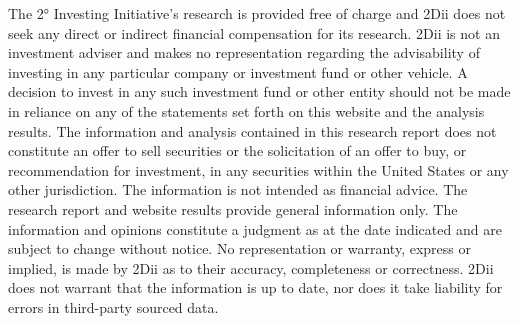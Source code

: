 \documentclass[10pt,table,a4]{article}\usepackage[]{graphicx}\usepackage[]{color}
\begin{document}
\begin{multicols}{2}
		The 2° Investing Initiative's research is provided free of charge and 2Dii does not seek any direct or indirect financial compensation for its research. 2Dii is not an investment adviser and makes no representation regarding the advisability of investing in any particular company or investment fund or other vehicle. A decision to invest in any such investment fund or other entity should not be made in reliance on any of the statements set forth on this website and the analysis results. The information and analysis contained in this research report does not constitute an offer to sell securities or the solicitation of an offer to buy, or recommendation for investment, in any securities within the United States or any other jurisdiction. The information is not intended as financial advice. The research report and website results provide general information only. The information and opinions constitute a judgment as at the date indicated and are subject to change without notice. No representation or warranty, express or implied, is made by 2Dii as to their accuracy, completeness or correctness. 2Dii does not warrant that the information is up to date, nor does it take liability for errors in third-party sourced data.
	\end{multicols}
	
	\newpage
	
	
\end{document}
